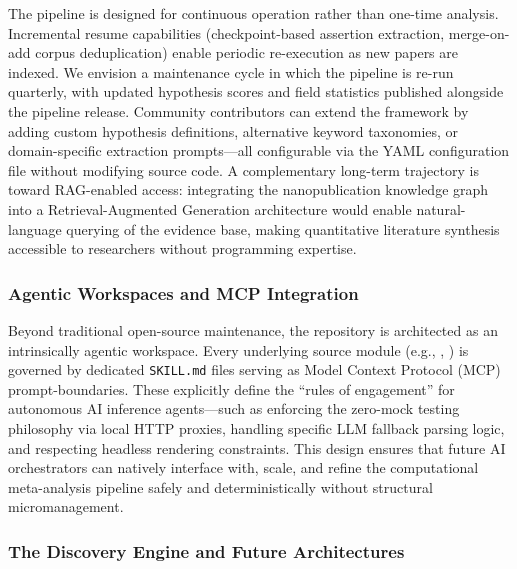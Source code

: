 \documentclass[
  english,
]{article}
\begin{document}
{{{{{{{{{{{{{{{{The pipeline is designed for continuous operation rather than one-time
analysis. Incremental resume capabilities (checkpoint-based assertion
extraction, merge-on-add corpus deduplication) enable periodic
re-execution as new papers are indexed. We envision a maintenance cycle
in which the pipeline is re-run quarterly, with updated hypothesis
scores and field statistics published alongside the pipeline release.
Community contributors can extend the framework by adding custom
hypothesis definitions, alternative keyword taxonomies, or
domain-specific extraction prompts---all configurable via the YAML
configuration file without modifying source code. A complementary
long-term trajectory is toward RAG-enabled access: integrating the
nanopublication knowledge graph into a Retrieval-Augmented Generation
architecture \citep{fan2024survey} would enable natural-language
querying of the evidence base, making quantitative literature synthesis
accessible to researchers without programming expertise.

\subsubsection{Agentic Workspaces and MCP
Integration}\label{agentic-workspaces-and-mcp-integration}

Beyond traditional open-source maintenance, the repository is
architected as an intrinsically agentic workspace. Every underlying
source module (e.g., ,
) is governed by dedicated \texttt{SKILL.md}
files serving as Model Context Protocol (MCP) prompt-boundaries. These
explicitly define the ``rules of engagement'' for autonomous AI
inference agents---such as enforcing the zero-mock testing philosophy
via local HTTP proxies, handling specific LLM fallback parsing logic,
and respecting headless rendering constraints. This design ensures that
future AI orchestrators can natively interface with, scale, and refine
the computational meta-analysis pipeline safely and deterministically
without structural micromanagement.

\subsubsection{The Discovery Engine and Future
Architectures}\label{the-discovery-engine-and-future-architectures}

}}}}}}}}}}}}}}}}
\end{document}
